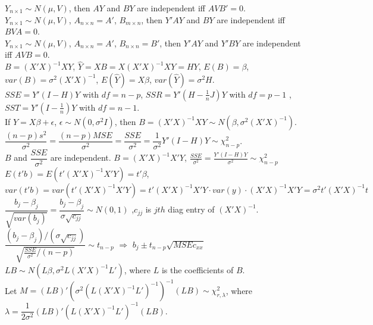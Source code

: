 \documentclass[10pt,landscape]{article}
\begin{document}
\begin{multicols}{3}
$Y_{n\times1}\sim N\left(\mu,V\right)$, then $AY$ and $BY$ are independent iff $AVB'=0$.\\
 $Y_{n\times1}\sim N\left(\mu,V\right)$, $A_{n\times n}=A'$, $B_{m\times n}$, then $Y'AY$ and $BY$ are independent iff $BVA=0$.\\
 $Y_{n\times1}\sim N\left(\mu,V\right)$, $A_{n\times n}=A'$, $B_{n\times n}=B'$, then $Y'AY$ and $Y'BY$ are independent iff $AVB=0$.\\
 $B=\left(X'X\right)^{-1}XY$, $\hat{Y}=XB=X\left(X'X\right)^{-1}XY=HY$, $E\left(B\right)=\beta$, $var\left(B\right)=\sigma^{2}\left(X'X\right)^{-1}$, $E\left(\hat{Y}\right)=X\beta$, $var\left(\hat{Y}\right)=\sigma^{2}H$.\\
 $SSE=Y'\left(I-H\right)Y$ with $df=n-p$, $SSR=Y'\left(H-\frac{1}{n}J\right)Y$ with $df=p-1$ , $SST=Y'\left(I-\frac{1}{n}\right)Y$ with $df=n-1$. \\
 If $Y=X\beta+\epsilon$, $\epsilon\sim N\left(0,\sigma^{2}I\right)$, then $B=\left(X'X\right)^{-1}XY\sim N\left(\beta,\sigma^{2}\left(X'X\right)^{-1}\right)$. \\
 $\dfrac{\left(n-p\right)s^{2}}{\sigma^{2}}=\dfrac{\left(n-p\right)MSE}{\sigma^{2}}=\dfrac{SSE}{\sigma^{2}}=\dfrac{1}{\sigma^{2}}Y'\left(I-H\right)Y\sim\chi_{n-p}^{2}$.\\
 $B$ and $\dfrac{SSE}{\sigma^{2}}$ are independent. $B = (X'X)^{-1}X'Y$, $\frac{SSE}{\sigma^2} = \frac{Y'(I-H)Y}{\sigma^2}\sim \chi_{n-p}^2$ \\
 $E(t'b) = E(t'(X'X)^{-1}X'Y) = t'\beta$, $var(t'b) = var(t'(X'X)^{-1}X'Y) = t'(X'X)^{-1}X'Y\cdot var(y)\cdot (X'X)^{-1}X'Y = \sigma^2 t'(X'X)^{-1}t$\\
 $\dfrac{b_{j}-\beta_{j}}{\sqrt{var\left(b_{j}\right)}}=\dfrac{b_{j}-\beta_{j}}{\sigma\sqrt{c_{jj}}}\sim N\left(0,1\right)$ ,$c_{jj}$ is $jth$ diag entry of $\left(X'X\right)^{-1}$.\\
 $\dfrac{\left(b_{j}-\beta_{j}\right)/\left(\sigma\sqrt{c_{jj}}\right)}{\sqrt{\frac{SSE}{\sigma^{2}}/\left(n-p\right)}}\sim t_{n-p}$ $\Rightarrow$ $b_{j}\pm t_{n-p}\sqrt{MSEc_{xx}}$\\
 $LB\sim N\left(L\beta,\sigma^{2}L\left(X'X\right)^{-1}L'\right)$, where $L$ is the coefficients of $B$.\\
 Let $M=\left(LB\right)'\left(\sigma^{2}\left(L\left(X'X\right)^{-1}L'\right)^{-1}\right)^{-1}\left(LB\right)\sim\chi_{r,\lambda}^{2}$, where $\lambda=\dfrac{1}{2\sigma^{2}}\left(LB\right)'\left(L\left(X'X\right)^{-1}L'\right)^{-1}\left(LB\right)$.\\

\end{multicols}
\end{document}
